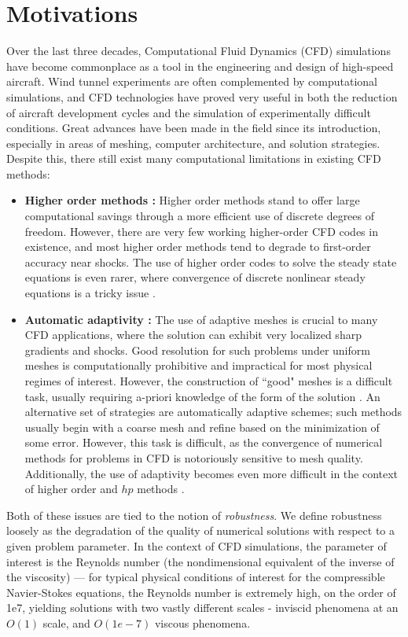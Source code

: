 
\section{Motivations}

Over the last three decades, Computational Fluid Dynamics (CFD) simulations have become commonplace as a tool in the engineering and design of high-speed aircraft.  Wind tunnel experiments are often complemented by computational simulations, and CFD technologies have proved very useful in both the reduction of aircraft development cycles and the simulation of experimentally difficult conditions.  Great advances have been made in the field since its introduction, especially in areas of meshing, computer architecture, and solution strategies.  Despite this, there still exist many computational limitations in existing CFD methods:  
\begin{itemize}
\item \textbf{Higher order methods :} Higher order methods stand to offer large computational savings through a more efficient use of discrete degrees of freedom.  However, there are very few working higher-order CFD codes in existence, and most higher order methods tend to degrade to first-order accuracy near shocks. The use of higher order codes to solve the steady state equations is even rarer, where convergence of discrete nonlinear steady equations is a tricky issue \cite{BoeingHigherOrder}.  
\item \textbf{Automatic adaptivity :} The use of adaptive meshes is crucial to many CFD applications, where the solution can exhibit very localized sharp gradients and shocks.  Good resolution for such problems under uniform meshes is computationally prohibitive and impractical for most physical regimes of interest.  However, the construction of ``good" meshes is a difficult task, usually requiring a-priori knowledge of the form of the solution \cite{andersonCFDBook}.  An alternative set of strategies are automatically adaptive schemes; such methods usually begin with a coarse mesh and refine based on the minimization of some error.  However, this task is difficult, as the convergence of numerical methods for problems in CFD is notoriously sensitive to mesh quality.  Additionally, the use of adaptivity becomes even more difficult in the context of higher order and $hp$ methods \cite{BoeingHigherOrder}.  
\end{itemize}
Both of these issues are tied to the notion of \emph{robustness}.  We define robustness loosely as the degradation of the quality of numerical solutions with respect to a given problem parameter.  In the context of CFD simulations, the parameter of interest is the Reynolds number (the nondimensional equivalent of the inverse of the viscosity) --- for typical physical conditions of interest for the compressible Navier-Stokes equations, the Reynolds number is extremely high, on the order of 1e7, yielding solutions with two vastly different scales - inviscid phenomena at an $O(1)$ scale, and $O(1e-7)$ viscous phenomena.  

